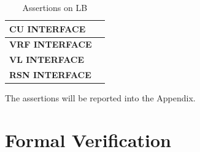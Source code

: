 \begin{table}[H]
\begin{tabular}{|l|l|}
    \hline

    \textbf{CU INTERFACE}  \\ \hline
   
    \hline

    \hline

    \textbf{VRF INTERFACE}  \\ \hline
   
    \hline

    \hline

    \textbf{VL INTERFACE}  \\ \hline
   
    \hline

    \hline

    \textbf{RSN INTERFACE}  \\ \hline
   
    \hline

    \end{tabular}
    \caption{Assertions on LB}
    \label{tab_lb_check}
\end{table}







The assertions will be reported into the Appendix.\\
\section{Formal Verification}

